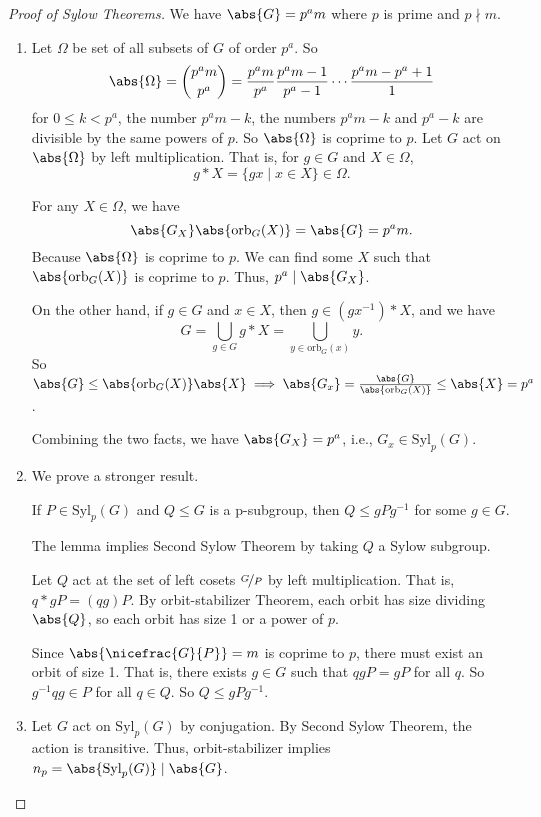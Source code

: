 \begin{proof}[Proof of Sylow Theorems]
    We have \(\abs{G} = p^a m\) where \(p\) is prime and \(p\nmid m\).
    \begin{enumerate}
        \item Let \(\Omega\) be set of all subsets of \(G\) of order \(p^a\). So
        \[
            \abs{\Omega} =\binom{p^a m}{p^a} = \frac{p^a m}{p^a} \frac{p^a m - 1}{p^a - 1}\cdots \frac{p^a m - p^a + 1}{1}
        \]
        for \(0 \leq k < p^a\), the number \(p^a m - k\), the numbers \(p^a m - k\) and \(p^a - k\) are divisible by the same powers of \(p\). So \(\abs{\Omega} \) is coprime to \(p\). Let \(G\) act on \(\abs{\Omega} \) by left multiplication. That is, for \(g \in G\) and \(X \in \Omega\),
        \[g * X = \{gx \mid x \in X\} \in \Omega.\]

        For any \(X \in \Omega\), we have
        \[
            \abs{G_X} \abs{\mathrm{orb}_G(X)} =\abs{G} =p^a m.
        \]
        Because \(\abs{\Omega} \) is coprime to \(p\). We can find some \(X\) such that \(\abs{\mathrm{orb}_G(X)} \) is coprime to \(p\). Thus, \(p^a \mid \abs{G_X} \).

        On the other hand, if \(g \in G\) and \(x \in X\), then \(g \in (gx^{-1})*X\), and we have
        \[
            G = \bigcup_{g\in G}g *X = \bigcup_{y\in \mathrm{orb}_G(x)}y.
        \]
        So \(\abs{G} \leq  \abs{\mathrm{orb}_G(X)} \abs{X}\implies \abs{G_x} = \frac{\abs{G}}{\abs{\mathrm{orb}_G(X)}} \leq \abs{X} =p^a \).

        Combining the two facts, we have \(\abs{G_X} =p^a\), i.e., \(G_x \in \mathrm{Syl}_p(G)\).
        \item We prove a stronger result.
        \begin{lemma}{}{}
            If \(P \in \mathrm{Syl}_p(G)\) and \(Q \leq G\) is a p-subgroup, then \(Q \leq gPg^{-1}\) for some \(g \in G\).
            \label{sylowp}
        \end{lemma}
        The lemma implies Second Sylow Theorem by taking \(Q\) a Sylow subgroup.

        Let \(Q\) act at the set of left cosets \(\nicefrac{G}{P}\) by left multiplication. That is, \(q * gP = (qg)P\). By orbit-stabilizer Theorem, each orbit has size dividing \(\abs{Q}\), so each orbit has size 1 or a power of \(p\).

        Since \(\abs{\nicefrac{G}{P}} = m\) is coprime to \(p\), there must exist an orbit of size 1. That is, there exists \(g \in G\) such that \(qgP = gP\) for all \(q\). So \(g^{-1}qg \in P\) for all \(q \in Q\). So \(Q \leq gPg^{-1}\).
        \item Let \(G\) act on \(\mathrm{Syl}_p(G)\) by conjugation. By Second Sylow Theorem, the action is transitive. Thus, orbit-stabilizer implies \(n_p = \abs{\mathrm{Syl}_p(G)}\mid \abs{G} \).


\end{enumerate}
\end{proof}
